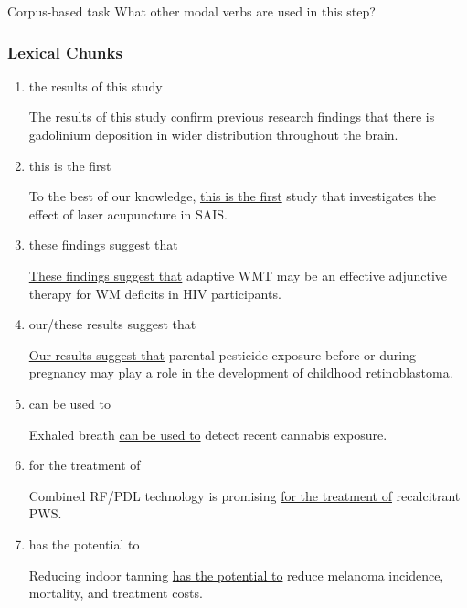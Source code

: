 \documentclass{ctexbook}
\begin{document}
    \begin{task}{\heiti Corpus-based task}
      What other modal verbs are used in this step?
    \end{task}

    \subsubsection{Lexical Chunks}

    \begin{enumerate}
      \item the results of this study
      \begin{eg}{}
        \uline{The results of this study} confirm previous research findings that there is gadolinium deposition in wider distribution throughout the brain.
      \end{eg}

      \item this is the first
      \begin{eg}{}
        To the best of our knowledge, \uline{this is the first} study that investigates the effect of laser acupuncture in SAIS.  
      \end{eg}

      \item these findings suggest that
      \begin{eg}{}
        \uline{These findings suggest that} adaptive WMT may be an effective adjunctive therapy for WM deficits in HIV participants.  
      \end{eg}

      \item our/these results suggest that
      \begin{eg}{}
        \uline{Our results suggest that} parental pesticide exposure before or during pregnancy may play a role in the development of childhood retinoblastoma. 
      \end{eg}

      \item can be used to
      \begin{eg}{}
        Exhaled breath \uline{can be used to} detect recent cannabis exposure.
      \end{eg}

      \item for the treatment of
      \begin{eg}{}
        Combined RF/PDL technology is promising \uline{for the treatment of} recalcitrant PWS. 
      \end{eg}

      \item has the potential to
      \begin{eg}{}
        Reducing indoor tanning \uline{has the potential to} reduce melanoma incidence, mortality, and treatment costs. 
      \end{eg}

    \end{enumerate}
\end{document}
